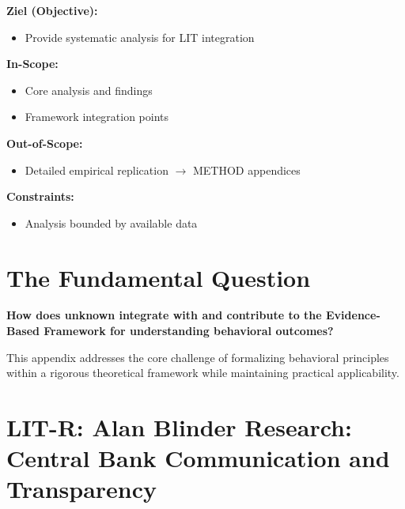 \begin{tcolorbox}[
    colback=orange!5!white,
    colframe=orange!75!black,
    title={\textbf{Appendix Scope: Ziel / In-Scope / Out-of-Scope / Constraints}},
    fonttitle=\bfseries
]

\textbf{Ziel (Objective):}
\begin{itemize}[nosep]
    \item Provide systematic analysis for LIT integration
\end{itemize}

\textbf{In-Scope:}
\begin{itemize}[nosep]
    \item Core analysis and findings
    \item Framework integration points
\end{itemize}

\textbf{Out-of-Scope:}
\begin{itemize}[nosep]
    \item Detailed empirical replication $\rightarrow$ METHOD appendices
\end{itemize}

\textbf{Constraints:}
\begin{itemize}[nosep]
    \item Analysis bounded by available data
\end{itemize}

\end{tcolorbox}

\section{The Fundamental Question}
\label{sec:bl-fundamental}

\begin{tcolorbox}[
    colback=red!5!white,
    colframe=red!75!black,
    title={\textbf{Fundamental Question}}
]
\textbf{How does unknown integrate with and contribute to the
Evidence-Based Framework for understanding behavioral outcomes?}

This appendix addresses the core challenge of formalizing behavioral principles
within a rigorous theoretical framework while maintaining practical applicability.
\end{tcolorbox}


\section{LIT-R: Alan Blinder Research: Central Bank Communication and Transparency}
\label{app:lit-blinder}

